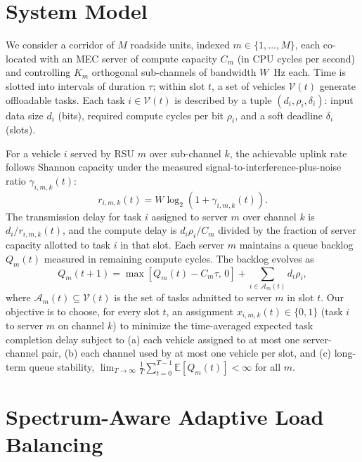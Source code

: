 \documentclass[journal,10pt]{IEEEtran}
\begin{document}
\section{System Model}
\label{sec:model}
We consider a corridor of $M$ roadside units, indexed $m \in \{1,\dots,M\}$, each co-located with an MEC server of compute capacity $C_m$ (in CPU cycles per second) and controlling $K_m$ orthogonal sub-channels of bandwidth $W$~Hz each. Time is slotted into intervals of duration $\tau$; within slot $t$, a set of vehicles $\mathcal{V}(t)$ generate offloadable tasks. Each task $i \in \mathcal{V}(t)$ is described by a tuple $(d_i, \rho_i, \delta_i)$: input data size $d_i$ (bits), required compute cycles per bit $\rho_i$, and a soft deadline $\delta_i$ (slots).

For a vehicle $i$ served by RSU $m$ over sub-channel $k$, the achievable uplink rate follows Shannon capacity under the measured signal-to-interference-plus-noise ratio $\gamma_{i,m,k}(t)$:
\begin{equation}
r_{i,m,k}(t) = W \log_2\!\left(1 + \gamma_{i,m,k}(t)\right).
\label{eq:rate}
\end{equation}
The transmission delay for task $i$ assigned to server $m$ over channel $k$ is $d_i / r_{i,m,k}(t)$, and the compute delay is $d_i \rho_i / C_m$ divided by the fraction of server capacity allotted to task $i$ in that slot. Each server $m$ maintains a queue backlog $Q_m(t)$ measured in remaining compute cycles. The backlog evolves as
\begin{equation}
Q_m(t+1) = \max\!\left[Q_m(t) - C_m \tau,\, 0\right] + \sum_{i \in \mathcal{A}_m(t)} d_i \rho_i,
\label{eq:queue}
\end{equation}
where $\mathcal{A}_m(t) \subseteq \mathcal{V}(t)$ is the set of tasks admitted to server $m$ in slot $t$. Our objective is to choose, for every slot $t$, an assignment $x_{i,m,k}(t) \in \{0,1\}$ (task $i$ to server $m$ on channel $k$) to minimize the time-averaged expected task completion delay subject to (a) each vehicle assigned to at most one server-channel pair, (b) each channel used by at most one vehicle per slot, and (c) long-term queue stability, $\lim_{T\to\infty} \frac{1}{T}\sum_{t=0}^{T-1} \mathbb{E}[Q_m(t)] < \infty$ for all $m$.

\section{Spectrum-Aware Adaptive Load Balancing}
\label{sec:method}
\end{document}
